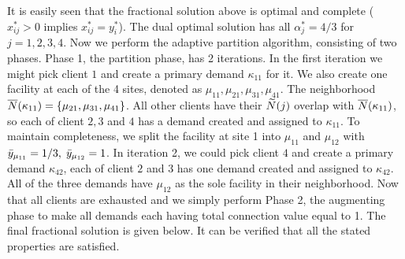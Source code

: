 \documentclass[11pt]{article}
\begin{document}
It is easily seen that the fractional solution above is
optimal and complete ($x_{ij}^\ast > 0$ implies $x_{ij}^\ast
= y_i^\ast$). The dual optimal solution has all
$\alpha_j^\ast = 4/3$ for $j=1,2,3,4$. Now we perform the
adaptive partition algorithm, consisting of two
phases. Phase 1, the partition phase, has 2 iterations. In
the first iteration we might pick client $1$ and create a
primary demand $\kappa_{11}$ for it. We also create one
facility at each of the 4 sites, denoted as $\mu_{11},
\mu_{21}, \mu_{31}, \mu_{41}$. The neighborhood
${\overline{N}}(\kappa_{11}) = \{\mu_{21},\mu_{31},\mu_{41}\}$. All
other clients have their ${\widetilde N}(j)$ overlap with
${\overline{N}}(\kappa_{11})$, so each of client $2,3$ and $4$ has a
demand created and assigned to $\kappa_{11}$. To maintain
completeness, we split the facility at site 1 into
$\mu_{11}$ and $\mu_{12}$ with ${\bar y}_{\mu_{11}}=1/3,\;
{\bar y}_{\mu_{12}} = 1$. In iteration 2, we could pick client
$4$ and create a primary demand $\kappa_{42}$, each of
client $2$ and $3$ has one demand created and assigned to
$\kappa_{42}$. All of the three demands have $\mu_{12}$ as
the sole facility in their neighborhood. Now that all
clients are exhausted and we simply perform Phase 2, the
augmenting phase to make all demands each having total
connection value equal to 1. The final fractional solution
is given below. It can be verified that all the stated
properties are satisfied.
\end{document}
